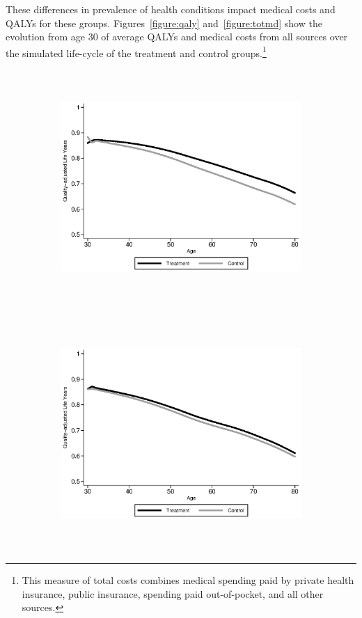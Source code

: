 \noindent These differences in prevalence of health conditions impact medical costs and QALYs for these groups. Figures~\ref{figure:qaly} and~\ref{figure:totmd} show the evolution from age 30 of average QALYs and medical costs from all sources over the simulated life-cycle of the treatment and control groups.\footnote{This measure of total costs combines medical spending paid by private health insurance, public insurance, spending paid out-of-pocket, and all other sources.} 

\begin{figure}[H]
    \centering
\caption{Predicted Quality-Adjusted Life Years} \label{figure:qaly}
\begin{subfigure}{.8\textwidth}
  \centering
  \includegraphics[height=3.5in]{AppOutput/Health/ABC-FAM_qaly_surv_summary_male}
\end{subfigure}

\begin{subfigure}{.8\textwidth} %
  \centering
  \includegraphics[height=3.5in]{AppOutput/Health/ABC-FAM_qaly_surv_summary_female}
\end{subfigure}
\end{figure}
